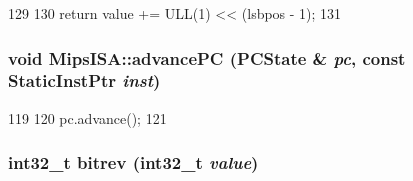 \begin{DoxyCode}
129 {
130     return value += ULL(1) << (lsbpos - 1);
131 }
\end{DoxyCode}
\hypertarget{namespaceMipsISA_a8029c9215d2beac3c8658dd94e492b7e}{
\subsubsection[{advancePC}]{\setlength{\rightskip}{0pt plus 5cm}void MipsISA::advancePC (PCState \& {\em pc}, \/  const {\bf StaticInstPtr} {\em inst})}}
\label{namespaceMipsISA_a8029c9215d2beac3c8658dd94e492b7e}



\begin{DoxyCode}
119 {
120     pc.advance();
121 }
\end{DoxyCode}
\hypertarget{namespaceMipsISA_a2754048764e174b0f0803486e4f829fd}{
\subsubsection[{bitrev}]{\setlength{\rightskip}{0pt plus 5cm}int32\_\-t bitrev (int32\_\-t {\em value})}}
\label{namespaceMipsISA_a2754048764e174b0f0803486e4f829fd}



